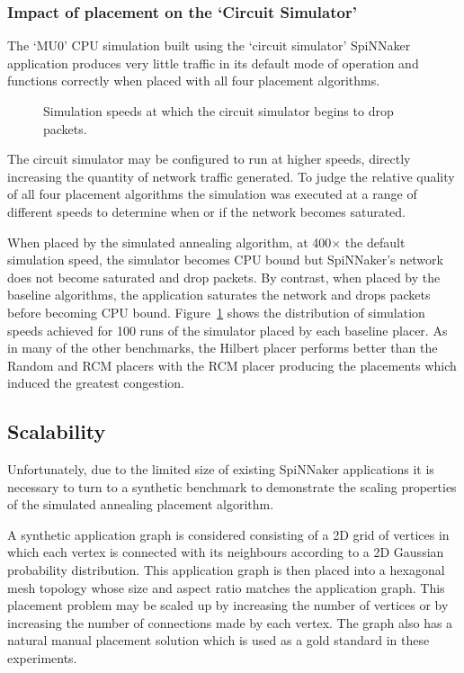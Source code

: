 			\subsubsection{Impact of placement on the `Circuit Simulator'}
				
				The `MU0' CPU simulation built using the `circuit simulator' SpiNNaker
				application produces very little traffic in its default mode of
				operation and functions correctly when placed with all four placement
				algorithms.
				
				\begin{figure}
					\center
					
					\caption[Packet dropping in `circuit simulator'.]%
					{Simulation speeds at which the circuit simulator begins to
					drop packets.}
					\label{fig:mu0-saturation}
				\end{figure}
				
				The circuit simulator may be configured to run at higher speeds,
				directly increasing the quantity of network traffic generated. To judge
				the relative quality of all four placement algorithms the simulation
				was executed at a range of different speeds to determine when or if the
				network becomes saturated.
				
				When placed by the simulated annealing algorithm, at 400$\times$ the
				default simulation speed, the simulator becomes CPU bound but
				SpiNNaker's network does not become saturated and drop packets. By
				contrast, when placed by the baseline algorithms, the application
				saturates the network and drops packets before becoming CPU bound.
				Figure~\ref{fig:mu0-saturation} shows the distribution of simulation
				speeds achieved for 100 runs of the simulator placed by each baseline
				placer. As in many of the other benchmarks, the Hilbert placer performs
				better than the Random and RCM placers with the RCM placer producing
				the placements which induced the greatest congestion.
			
		\subsection{Scalability}
			
			Unfortunately, due to the limited size of existing SpiNNaker applications
			it is necessary to turn to a synthetic benchmark to demonstrate the
			scaling properties of the simulated annealing placement algorithm.
			
			A synthetic application graph is considered consisting of a 2D grid of
			vertices in which each vertex is connected with its neighbours according
			to a 2D Gaussian probability distribution. This application graph is then
			placed into a hexagonal mesh topology whose size and aspect ratio matches
			the application graph. This placement problem may be scaled up by
			increasing the number of vertices or by increasing the number of
			connections made by each vertex. The graph also has a natural manual
			placement solution which is used as a gold standard in these experiments.
			
